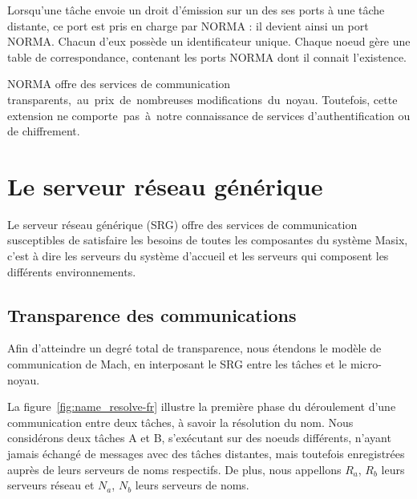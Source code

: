 Lorsqu'une t\^ache envoie un droit d'\'emission sur un des ses ports \`a une t\^ache distante, ce port est pris en charge par NORMA : il devient ainsi un port 
NORMA. Chacun d'eux poss\`ede un identificateur unique. Chaque 
noeud g\`ere une table de correspondance, contenant les ports NORMA 
dont il connait l'existence. 

NORMA offre des services de communication transpa\-rents,~au~prix~de~nombreuses modifications~du~noyau. Toutefois, cette extension ne comporte~pas~\`a~notre
 connais\-sance de services d'authentification ou de chiffrement.

\section {Le serveur r\'eseau g\'en\'erique}

Le serveur r\'eseau g\'en\'erique (SRG) offre des services de communication susceptibles de satisfaire les besoins de toutes les composantes du syst\`eme 
Masix, c'est \`a dire les serveurs du syst\`eme d'accueil et les 
serveurs qui composent les diff\'erents environnements. 

\subsection{Transparence des communications}

Afin d'atteindre un degr\'e total de transparence, nous \'etendons le mod\`ele
de communication de Mach, en interposant le SRG entre les t\^aches et le
micro-noyau.

La figure~\ref{fig:name_resolve-fr} illustre la premi\`ere phase du d\'eroulement d'une communication entre deux t\^aches, \`a savoir la r\'esolution du nom. Nous consid\'erons deux t\^aches A et B, s'ex\'ecutant sur des noeuds diff\'erents, n'ayant jamais \'echang\'e de messages avec des t\^aches distantes, mais toutefois enregistr\'ees aupr\`es de leurs serveurs de noms respectifs. De plus, nous appellons \(R_{a}\), \(R_{b}\) leurs serveurs r\'eseau et \(N_{a}\), \(N_{b}\) leurs serveurs de noms.


